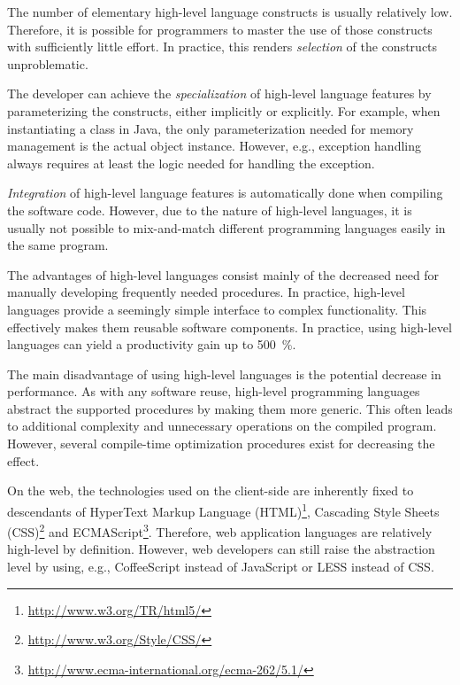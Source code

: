 The number of elementary high-level language constructs is usually relatively low. Therefore, it is possible for programmers to master the use of those constructs with sufficiently little effort. In practice, this renders \emph{selection} of the constructs unproblematic. \citep[chap.~3]{krueger_software_1992}

The developer can achieve the \emph{specialization} of high-level language features by parameterizing the constructs, either implicitly or explicitly. For example, when instantiating a class in Java, the only parameterization needed for memory management is the actual object instance. However, e.g., exception handling always requires at least the logic needed for handling the exception. \citep[chap.~3]{krueger_software_1992}

\emph{Integration} of high-level language features is automatically done when compiling the software code. However, due to the nature of high-level languages, it is usually not possible to mix-and-match different programming languages easily in the same program. \citep[chap.~3]{krueger_software_1992} %

The advantages of high-level languages consist mainly of the decreased need for manually developing frequently needed procedures. In practice, high-level languages provide a seemingly simple interface to complex functionality. This effectively makes them reusable software components. In practice, using high-level languages can yield a productivity gain up to 500~\%. \citep[chap.~3]{krueger_software_1992}

The main disadvantage of using high-level languages is the potential decrease in performance. As with any software reuse, high-level programming languages abstract the supported procedures by making them more generic. This often leads to additional complexity and unnecessary operations on the compiled program. However, several compile-time optimization procedures exist for decreasing the effect. \citep{carro_high-level_2006}

On the web, the technologies used on the client-side are inherently fixed to descendants of HyperText Markup Language (HTML)\footnote{\url{http://www.w3.org/TR/html5/}}, Cascading Style Sheets (CSS)\footnote{\url{http://www.w3.org/Style/CSS/}} and ECMAScript\footnote{\url{http://www.ecma-international.org/ecma-262/5.1/}}. Therefore, web application languages are relatively high-level by definition. However, web developers can still raise the abstraction level by using, e.g., CoffeeScript \citep{ashkenas_coffeescript_2009} instead of JavaScript or LESS \citep{sellier_less_2009} instead of CSS.

